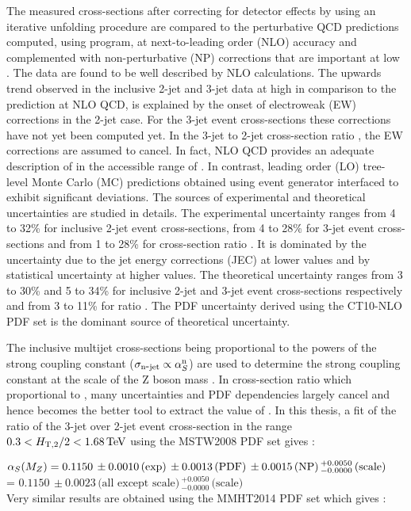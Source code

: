 The measured cross-sections after correcting for detector effects by using an iterative unfolding procedure are compared to the perturbative QCD predictions computed, using \NLOJETPP program, at next-to-leading order (NLO) accuracy and complemented with non-perturbative (NP) corrections that are important at low \httwo. The data are found to be well described by NLO calculations. The upwards trend observed in the inclusive 2-jet and 3-jet data at high \httwo in comparison to the prediction at NLO QCD, is explained by the onset of electroweak (EW) corrections in the 2-jet case. For the 3-jet event cross-sections these corrections have not yet been computed yet. In the 3-jet to 2-jet cross-section ratio \ratio, the EW corrections are assumed to cancel. In fact, NLO QCD provides an adequate description of \ratio in the accessible range of \httwo. In contrast, leading order (LO) tree-level Monte Carlo (MC) predictions obtained using \MadGraphF event generator interfaced to \PYTHIAS exhibit significant deviations. The sources of experimental and theoretical uncertainties are studied in details. The experimental uncertainty ranges from 4 to 32\% for inclusive 2-jet event cross-sections, from 4 to 28\% for 3-jet event cross-sections and from 1 to 28\% for cross-section ratio \ratio. It is dominated by the uncertainty due to the jet energy corrections (JEC) at lower \httwo values and by statistical uncertainty at higher \httwo values. The theoretical uncertainty ranges from 3 to 30\% and 5 to 34\% for inclusive 2-jet and 3-jet event cross-sections respectively and from 3 to 11\% for ratio \ratio. The PDF uncertainty derived using the CT10-NLO PDF set is the dominant source of theoretical uncertainty.

The inclusive multijet cross-sections being proportional to the powers of the strong coupling constant \alps ($\sigma_{\rm n\mbox{-} jet} \propto\alpha_S^{\rm n}$) are used to determine the strong coupling constant at the scale of the Z boson mass \alpsmz. In cross-section ratio \ratio which proportional to \alps, many uncertainties and PDF dependencies largely cancel and hence becomes the better tool to extract the value of \alpsmz. In this thesis, a fit of the ratio of the 3-jet over 2-jet event cross-section \ratio in the range $0.3 < H_{\mathrm{T,2}}/2 < 1.68\,\text{Te\hspace{-.08em}V}$ using the MSTW2008 PDF set gives : 

$\alpha_S(M_Z) = 0.1150\,\pm0.0010\,\textrm{(exp)}\,\pm0.0013\,\textrm{(PDF)}\,\pm0.0015\,\textrm{(NP)}\,^{+0.0050}_{-0.0000}\,\textrm{(scale)}$ \\ \hspace*{24mm} = $0.1150\,\pm0.0023\,\textrm{(all except scale)}\,^{+0.0050}_{-0.0000}\,\textrm{(scale)}$ \\
Very similar results are obtained using the MMHT2014 PDF set which gives : 

